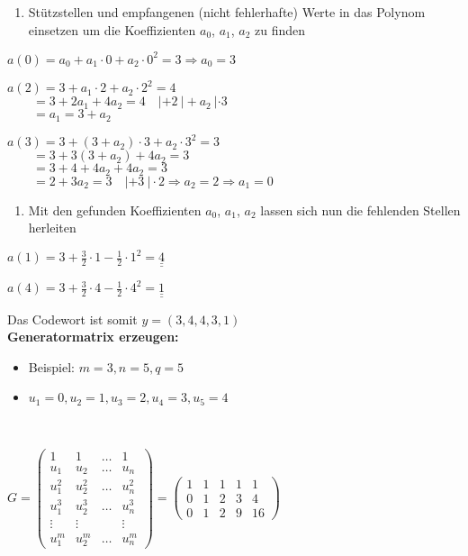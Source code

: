 \begin{enumerate}[leftmargin=*]
\item Stützstellen und empfangenen (nicht fehlerhafte) Werte in das Polynom einsetzen um die Koeffizienten $a_0$, $a_1$, $a_2$ zu finden
\end{enumerate}

$a(0) = a_0 + a_1 \cdot 0 + a_2 \cdot 0^2 = 3 \Rightarrow \boxed{a_0 = 3}$

$a(2) = 3 + a_1 \cdot 2 + a_2 \cdot 2^2 = 4$\\
$\text{}\qquad = 3 + 2a_1 + 4a_2 = 4 \quad |+2 \ | +a_2 \ | \cdot 3$\\
$\text{}\qquad = a_1 = 3 +a_2$

$a(3) = 3 + (3 +a_2) \cdot 3 + a_2 \cdot 3^2 = 3$\\
$\text{}\qquad = 3 + 3(3 +a_2) + 4a_2 = 3$\\
$\text{}\qquad = 3 + 4 + 4a_2 + 4a_2 = 3$\\
$\text{}\qquad = 2 + 3a_2 = 3 \quad |+3 \ | \cdot 2 \Rightarrow \boxed{a_2 = 2} \Rightarrow \boxed{a_1 = 0}$\\

\begin{enumerate}[leftmargin=*, label={2.}]
\item Mit den gefunden Koeffizienten $a_0$, $a_1$, $a_2$ lassen sich nun die fehlenden Stellen herleiten
\end{enumerate}

$a(1) = 3 + \frac{3}{2} \cdot 1 - \frac{1}{2} \cdot 1^2 = \underline{\underline{4}}$

$a(4) = 3 + \frac{3}{2} \cdot 4 - \frac{1}{2} \cdot 4^2 = \underline{\underline{1}}$

Das Codewort ist somit $y = (3, 4, 4, 3, 1)$\\

\textbf{Generatormatrix erzeugen:}

\begin{itemize}
\item Beispiel: $m=3, n = 5, q = 5$
\item $u_1 = 0, u_2 = 1, u_3 = 2, u_4 = 3, u_5 = 4$
\end{itemize}\

$G = \begin{pmatrix}
1        & 1      & \dots & 1\\
u_1   & u_2    & \dots & u_n\\
u_1^2  & u_2^2  & \dots & u_n^2\\
u_1^3  & u_2^3  & \dots & u_n^3\\
\vdots & \vdots &  & \vdots\\
u_1^m  & u_2^m  & \dots & u_n^m
\end{pmatrix} = \begin{pmatrix}
1 & 1 & 1 & 1 & 1\\
0 & 1 & 2 & 3 & 4\\
0 & 1 & 2 & 9 & 16
\end{pmatrix}$\
\\

